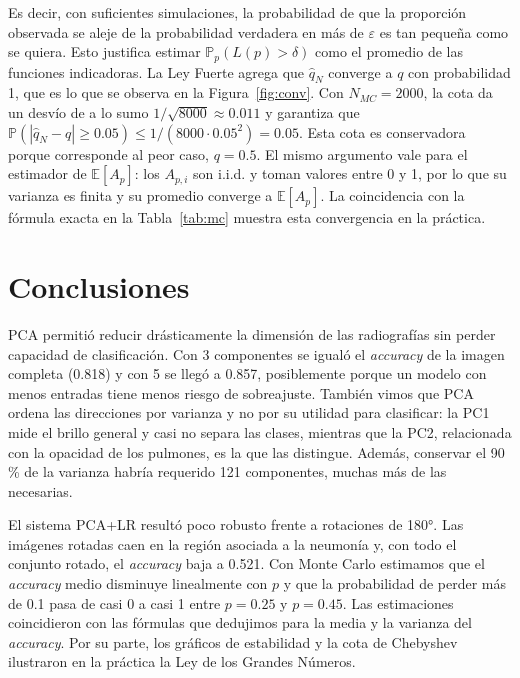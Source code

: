 \documentclass[11pt,a4paper]{article}
\newcommand{\E}{\mathbb{E}}
\newcommand{\Prob}{\mathbb{P}}
\newcommand{\acc}{\emph{accuracy}}
\begin{document}
Es decir, con suficientes simulaciones, la probabilidad de que la proporción observada se aleje de la
probabilidad verdadera en más de $\varepsilon$ es tan pequeña como se quiera. Esto justifica estimar
$\Prob_p(L(p)>\delta)$ como el promedio de las funciones indicadoras. La Ley Fuerte agrega que $\hat q_N$
converge a $q$ con probabilidad 1, que es lo que se observa en la Figura~\ref{fig:conv}. Con $N_{MC}=2000$, la
cota da un desvío de a lo sumo $1/\sqrt{8000}\approx0.011$ y garantiza que
$\Prob(|\hat q_N-q|\ge0.05)\le 1/(8000\cdot 0.05^2) = 0.05$. Esta cota es conservadora porque corresponde al
peor caso, $q=0.5$. El mismo argumento vale para el estimador de $\E[A_p]$: los $A_{p,i}$ son i.i.d. y toman
valores entre 0 y 1, por lo que su varianza es finita y su promedio converge a $\E[A_p]$. La coincidencia con
la fórmula exacta en la Tabla~\ref{tab:mc} muestra esta convergencia en la práctica.

\section{Conclusiones}
PCA permitió reducir drásticamente la dimensión de las radiografías sin perder capacidad de clasificación.
Con 3 componentes se igualó el \acc{} de la imagen completa (0.818) y con 5 se llegó a 0.857, posiblemente
porque un modelo con menos entradas tiene menos riesgo de sobreajuste. También vimos que PCA ordena las
direcciones por varianza y no por su utilidad para clasificar: la PC1 mide el brillo general y casi no separa
las clases, mientras que la PC2, relacionada con la opacidad de los pulmones, es la que las distingue.
Además, conservar el 90\,\% de la varianza habría requerido 121 componentes, muchas más de las necesarias.

El sistema PCA+LR resultó poco robusto frente a rotaciones de 180°. Las imágenes rotadas caen en la región
asociada a la neumonía y, con todo el conjunto rotado, el \acc{} baja a 0.521. Con Monte Carlo estimamos que
el \acc{} medio disminuye linealmente con $p$ y que la probabilidad de perder más de 0.1 pasa de casi 0 a casi
1 entre $p=0.25$ y $p=0.45$. Las estimaciones coincidieron con las fórmulas que dedujimos para la media y la
varianza del \acc{}. Por su parte, los gráficos de estabilidad y la cota de Chebyshev ilustraron en la
práctica la Ley de los Grandes Números.
\end{document}
